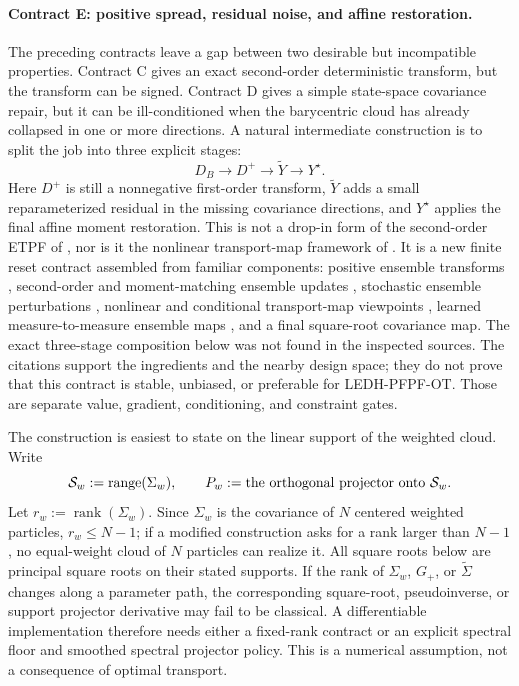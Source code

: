 \paragraph{Contract E: positive spread, residual noise, and affine restoration.}
The preceding contracts leave a gap between two desirable but incompatible
properties.  Contract C gives an exact second-order deterministic transform, but
the transform can be signed.  Contract D gives a simple state-space covariance
repair, but it can be ill-conditioned when the barycentric cloud has already
collapsed in one or more directions.  A natural intermediate construction is to
split the job into three explicit stages:
\[
  D_B \longrightarrow D^+
  \longrightarrow \widetilde Y
  \longrightarrow Y^\star .
\]
Here \(D^+\) is still a nonnegative first-order transform, \(\widetilde Y\)
adds a small reparameterized residual in the missing covariance directions, and
\(Y^\star\) applies the final affine moment restoration.  This is not a
drop-in form of the second-order ETPF of
\citet{acevedodewiljesreich2017secondorder}, nor is it the nonlinear
transport-map framework of \citet{spantini2022coupling}.  It is a new finite
reset contract assembled from familiar components: positive ensemble transforms
\citep{reich2013nonparametric,corenflos2021differentiable}, second-order and
moment-matching ensemble updates
\citep{lei2011moment,todter2015secondorder,kirchgessner2017smoother,acevedodewiljesreich2017secondorder},
stochastic ensemble perturbations \citep{vanleeuwen2020consistent}, nonlinear
and conditional transport-map viewpoints
\citep{taghvaeihosseini2022bayesot,spantini2022coupling,hosseini2025conditional,zeng2026coupling},
learned measure-to-measure ensemble maps \citep{bach2026learning}, and a final
square-root covariance map.  The exact three-stage composition below was not
found in the inspected sources.  The citations support the ingredients and the
nearby design space; they do not prove that this contract is stable, unbiased,
or preferable for LEDH-PFPF-OT.  Those are separate value, gradient,
conditioning, and constraint gates.

The construction is easiest to state on the linear support of the weighted
cloud.  Write
\[
  \mathcal S_w:=\operatorname{range}(\Sigma_w),
  \qquad
  P_w:=\hbox{the orthogonal projector onto }\mathcal S_w .
\]
Let \(r_w:=\operatorname{rank}(\Sigma_w)\).  Since \(\Sigma_w\) is the covariance
of \(N\) centered weighted particles, \(r_w\le N-1\); if a modified construction
asks for a rank larger than \(N-1\), no equal-weight cloud of \(N\) particles can
realize it.  All square roots below are principal square roots on their stated
supports.  If
the rank of \(\Sigma_w\), \(G_+\), or \(\widetilde\Sigma\) changes along a
parameter path, the corresponding square-root, pseudoinverse, or support
projector derivative may fail to be classical.  A differentiable implementation
therefore needs either a fixed-rank contract or an explicit spectral floor and
smoothed spectral projector policy.  This is a numerical assumption, not a
consequence of optimal transport.

